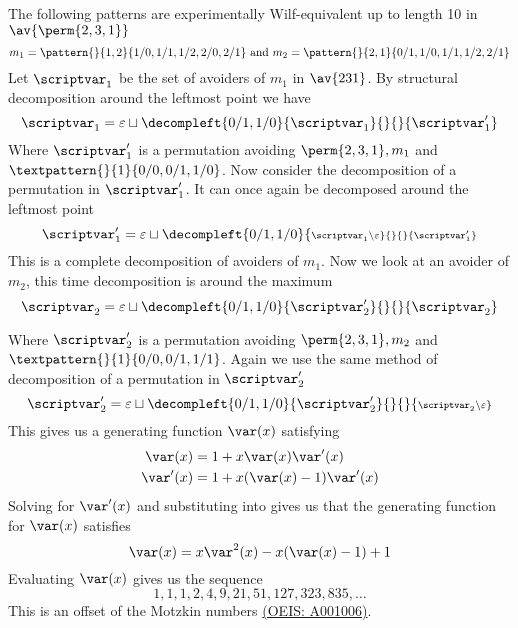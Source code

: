 \subsection{}
\nextvar
The following patterns are experimentally Wilf-equivalent up to length 10 in
\(\av{\perm{2,3,1}}\)
\begin{equation*}
    m_1 = \pattern{}{1,2}{1/0,1/1,1/2,2/0,2/1} \text{ and }
    m_2 = \pattern{}{2,1}{0/1,1/0,1/1,1/2,2/1}
\end{equation*}
Let \(\scriptvar_1\) be the set of avoiders of \(m_1\) in \(\av{231}\). By structural decomposition
around the leftmost point we have
\begin{equation*}
    \scriptvar_1 = \varepsilon \sqcup
    \decompleft{0/1,1/0}{\scriptvar_1}{}{}{\scriptvar^\prime_1}
\end{equation*}
Where \(\scriptvar^\prime_1\) is a permutation avoiding \(\perm{2,3,1}, m_1\)
and \(\textpattern{}{1}{0/0,0/1,1/0}\).
Now consider the decomposition of a permutation in \(\scriptvar^\prime_1\). It can
once again be decomposed around the leftmost point
\begin{equation*}
    \scriptvar^\prime_1 = \varepsilon \sqcup
    \decompleft{0/1,1/0}{\scriptstyle \scriptvar_1\setminus\varepsilon}{}{}{\scriptvar^\prime_1}
\end{equation*}
This is a complete decomposition of avoiders of \(m_1\). Now we
look at an avoider of \(m_2\), this time decomposition is around the maximum
\begin{equation*}
    \scriptvar_2 = \varepsilon \sqcup
    \decompleft{0/1,1/0}{\scriptvar^\prime_2}{}{}{\scriptvar_2}
\end{equation*}

Where \(\scriptvar^\prime_2\) is a permutation avoiding \(\perm{2,3,1}, m_2\)
and \(\textpattern{}{1}{0/0,0/1,1/1}\).
Again we use the same method of decomposition of a permutation in \(\scriptvar^\prime_2\)
\begin{equation*}
    \scriptvar^\prime_2 = \varepsilon \sqcup
    \decompleft{0/1,1/0}{\scriptvar^\prime_2}{}{}{\scriptstyle \scriptvar_2\setminus\varepsilon}
\end{equation*}
This gives us a generating function \(\var(x)\) satisfying
\begin{align}
    \var(x) &= 1 + x\var(x)\var^\prime(x) \label{eqn:Pgen}\\
    \var^\prime(x) &= 1 + x(\var(x)-1)\var^\prime(x)\label{eqn:PprimeGen}
\end{align}
Solving  for \(\var^\prime(x)\) and substituting into
 gives us that the generating function for
\(\var(x)\) satisfies
\begin{equation}
    \var(x) = x\var^2(x) - x(\var(x) - 1) + 1
\end{equation}
Evaluating \(\var(x)\) gives us the sequence
\begin{equation*}
    1, 1, 1, 2, 4, 9, 21, 51, 127, 323, 835,\dotsc
\end{equation*}
This is an offset of the Motzkin numbers \href{https://oeis.org/A001006}{(OEIS: A001006)}.


